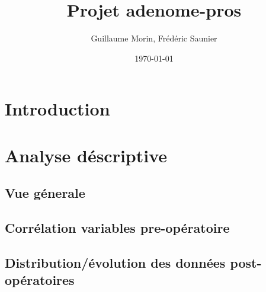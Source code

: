 \documentclass[12pt]{article}
\title{Projet  adenome-pros}
\author{Guillaume Morin, Frédéric Saunier}
\date{\today}
\begin{document}
\maketitle
\tableofcontents
\clearpage



\section{Introduction}

\newpage

\section{Analyse déscriptive}


\subsection{Vue génerale}
  

\subsection{Corrélation variables pre-opératoire}
  

\subsection{Distribution/évolution des données post-opératoires}
  
  
  
\newpage




%



\end{document}
